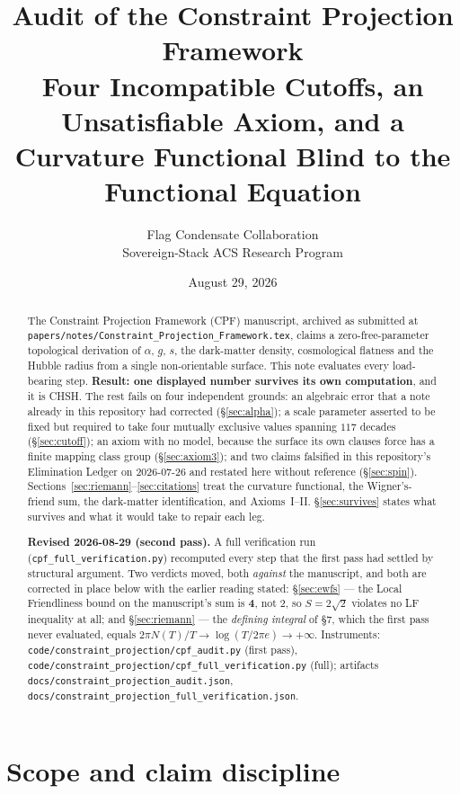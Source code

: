 \documentclass[11pt,a4paper]{article}
\title{\textbf{Audit of the Constraint Projection Framework}\\[0.35em]
\large Four Incompatible Cutoffs, an Unsatisfiable Axiom, and a
Curvature Functional Blind to the Functional Equation}
\author{Flag Condensate Collaboration \\ Sovereign-Stack ACS Research Program}
\date{August 29, 2026}
\begin{document}
\maketitle

\begin{abstract}
The Constraint Projection Framework (CPF) manuscript, archived as submitted at
\texttt{papers/notes/Constraint\_Projection\_Framework.tex}, claims a
zero-free-parameter topological derivation of $\alpha$, $g$, $s$, the dark-matter
density, cosmological flatness and the Hubble radius from a single non-orientable
surface. This note evaluates every load-bearing step. \textbf{Result: one displayed
number survives its own computation}, and it is CHSH. The rest fails on four
independent grounds: an algebraic error that a note already in this repository had
corrected (\S\ref{sec:alpha}); a scale parameter asserted to be fixed but required to
take four mutually exclusive values spanning $117$ decades (\S\ref{sec:cutoff}); an
axiom with no model, because the surface its own clauses force has a finite mapping
class group (\S\ref{sec:axiom3}); and two claims falsified in this repository's
Elimination Ledger on 2026-07-26 and restated here without reference
(\S\ref{sec:spin}). Sections~\ref{sec:riemann}--\ref{sec:citations} treat the
curvature functional, the Wigner's-friend sum, the dark-matter identification, and
Axioms~I--II. \S\ref{sec:survives} states what survives and what it would take to
repair each leg.

\textbf{Revised 2026-08-29 (second pass).} A full verification run
(\texttt{cpf\_full\_verification.py}) recomputed every step that the first pass had
settled by structural argument. Two verdicts moved, both \emph{against} the
manuscript, and both are corrected in place below with the earlier reading stated:
\S\ref{sec:ewfs} --- the Local Friendliness bound on the manuscript's sum is
\textbf{4}, not $2$, so $S=2\sqrt2$ violates no LF inequality at all; and
\S\ref{sec:riemann} --- the \emph{defining integral} of \S7, which the first pass
never evaluated, equals $2\pi N(T)/T \to \log(T/2\pi e) \to +\infty$.
Instruments: \texttt{code/constraint\_projection/cpf\_audit.py} (first pass),
\texttt{code/constraint\_projection/cpf\_full\_verification.py} (full);
artifacts \texttt{docs/constraint\_projection\_audit.json},
\texttt{docs/constraint\_projection\_full\_verification.json}.
\end{abstract}

\section{Scope and claim discipline}
\end{document}
